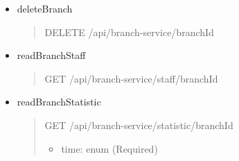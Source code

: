 \begin{itemize}
	\item deleteBranch
	      \begin{quote}
		      DELETE /api/branch-service/{branchId}
	      \end{quote}

	\item readBranchStaff
	      \begin{quote}
		      GET /api/branch-service/staff/{branchId}
	      \end{quote}

	\item readBranchStatistic
	      \begin{quote}
		      GET /api/branch-service/statistic/{branchId}
		      \begin{itemize}
			      \item time: enum (Required)
		      \end{itemize}
	      \end{quote}
\end{itemize}

